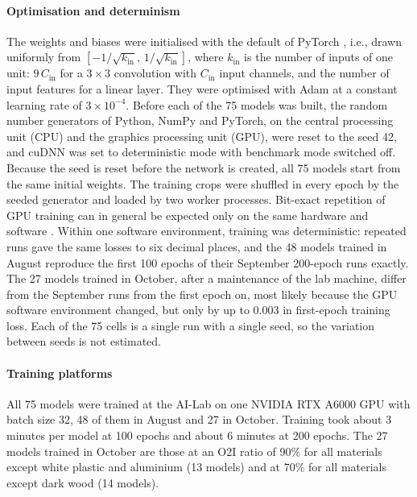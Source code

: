 \paragraph{Optimisation and determinism}
The weights and biases were initialised with the default of PyTorch \citep{pytorch2025init}, i.e., drawn uniformly from
$[-1/\sqrt{k_{\mathrm{in}}},\, 1/\sqrt{k_{\mathrm{in}}}]$, where $k_{\mathrm{in}}$ is
the number of inputs of one unit: $9\,C_{\mathrm{in}}$ for a $3 \times 3$ convolution
with $C_{\mathrm{in}}$ input channels, and the number of input features for a linear
layer. They were optimised with Adam \citep{kingma2015adam} at a constant learning
rate of $3 \times 10^{-4}$. Before each of the 75 models was built, the random number
generators of Python, NumPy and PyTorch, on the central processing unit (CPU) and the
graphics processing unit (GPU), were reset to the seed 42, and
cuDNN was set to deterministic mode with benchmark mode switched off. Because the seed
is reset before the network is created, all 75 models start from the same initial
weights. The training crops were shuffled in every epoch by the seeded generator and
loaded by two worker processes. Bit-exact repetition of GPU training can in general be
expected only on the same hardware and software \citep{pytorch2025reproducibility}. Within one
software environment, training was deterministic: repeated runs gave the same losses to
six decimal places, and the 48 models trained in August reproduce the first 100 epochs
of their September 200-epoch runs exactly. The 27 models trained in October, after a
maintenance of the lab machine, differ from the September runs from the first epoch on,
most likely because the GPU software environment changed, but only by up to 0.003 in
first-epoch training loss. Each of the 75 cells is a single run with a single
seed, so the variation between seeds is not estimated.

\paragraph{Training platforms}
\label{sec:methodology-platforms}
All 75 models were trained at the AI-Lab on one NVIDIA RTX A6000 GPU with batch size
32, 48 of them in August and 27 in October. Training took about 3 minutes per model at
100 epochs and about 6 minutes at 200 epochs. The 27 models trained in October are
those at an O2I ratio of 90\% for all materials except white plastic and aluminium (13
models) and at 70\% for all materials except dark wood (14 models).

